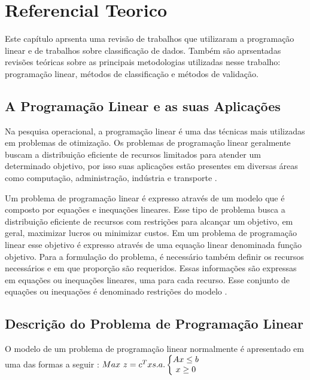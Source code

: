 \chapter{Referencial Teorico}

Este capítulo aprsenta uma revisão de trabalhos que utilizaram a programação linear e de trabalhos sobre classificação de dados. Também são aprsentadas revisões teóricas sobre as principais metodologias utilizadas nesse trabalho: programação linear, métodos de classificação e métodos de validação. 

\section{A Programação Linear e as suas Aplicações}
Na pesquisa operacional, a programação linear é uma das técnicas mais utilizadas em problemas de otimização. Os problemas de programação linear geralmente buscam a distribuição eficiente de recursos limitados para atender um determinado objetivo, por isso suas aplicações estão presentes em diversas áreas como computação, administração, indústria e transporte \cite{Engecom}.

Um problema de programação linear é expresso através de um modelo que é composto por equações e inequações lineares. Esse tipo de problema busca a distribuição eficiente de recursos com restrições para alcançar um objetivo, em geral, maximizar lucros ou minimizar custos. Em um problema de programação linear esse objetivo é expresso através de uma equação linear denominada função objetivo. Para a formulação do problema, é necessário também definir os recursos necessários e em que proporção são requeridos. Essas informações são expressas em equações ou inequações lineares, uma para cada recurso. Esse conjunto de equações ou inequações é denominado restrições do modelo \cite{Engecom}.

\section{Descrição do Problema de Programação Linear}
O modelo de um problema de programação linear normalmente é apresentado em uma das formas a seguir \cite{Passos}:
$\\Max\ z = c^{T}x \\\\s.a.\left\{\begin{matrix}
Ax\leq b\\x\geq 0 
\end{matrix}\right.$  

